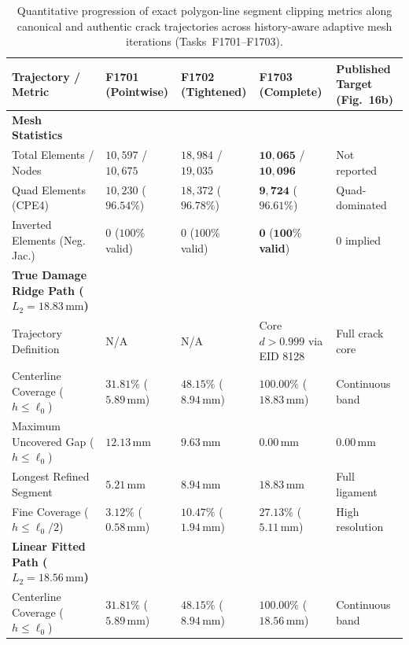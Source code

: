 \begin{table}[htbp]
\centering
\scriptsize
\renewcommand{\arraystretch}{0.90}
\caption{Quantitative progression of exact polygon-line segment clipping metrics along canonical and authentic crack trajectories across history-aware adaptive mesh iterations (Tasks~F1701--F1703).}
\label{tab:f1703_exact_clipping_progression}
\begin{tabularx}{\textwidth}{p{3.8cm}XXXX}
\hline
\textbf{Trajectory / Metric} & \textbf{F1701 (Pointwise)} & \textbf{F1702 (Tightened)} & \textbf{F1703 (Complete)} & \textbf{Published Target (Fig.~16b)} \\
\hline
\textbf{Mesh Statistics} & & & & \\
Total Elements / Nodes & $10{,}597$ / $10{,}675$ & $18{,}984$ / $19{,}035$ & $\mathbf{10{,}065}$ / $\mathbf{10{,}096}$ & Not reported \\
Quad Elements (CPE4) & $10{,}230$ ($96.54\%$) & $18{,}372$ ($96.78\%$) & $\mathbf{9{,}724}$ ($\mathbf{96.61\%}$) & Quad-dominated \\
Inverted Elements (Neg. Jac.) & $0$ ($100\%$ valid) & $0$ ($100\%$ valid) & $\mathbf{0}$ ($\mathbf{100\%}$ \textbf{valid}) & $0$ implied \\
\hline
\textbf{True Damage Ridge Path ($L_2 = 18.83\,\mathrm{mm}$)} & & & & \\
Trajectory Definition & N/A & N/A & Core $d > 0.999$ via EID 8128 & Full crack core \\
Centerline Coverage ($h \le \ell_0$) & $31.81\%$ ($5.89\,\mathrm{mm}$) & $48.15\%$ ($8.94\,\mathrm{mm}$) & $\mathbf{100.00\%}$ ($\mathbf{18.83\,\mathrm{mm}}$) & Continuous band \\
Maximum Uncovered Gap ($h \le \ell_0$) & $12.13\,\mathrm{mm}$ & $9.63\,\mathrm{mm}$ & $\mathbf{0.00\,\mathrm{mm}}$ & $0.00\,\mathrm{mm}$ \\
Longest Refined Segment & $5.21\,\mathrm{mm}$ & $8.94\,\mathrm{mm}$ & $\mathbf{18.83\,\mathrm{mm}}$ & Full ligament \\
Fine Coverage ($h \le \ell_0/2$) & $3.12\%$ ($0.58\,\mathrm{mm}$) & $10.47\%$ ($1.94\,\mathrm{mm}$) & $\mathbf{27.13\%}$ ($\mathbf{5.11\,\mathrm{mm}}$) & High resolution \\
\hline
\textbf{Linear Fitted Path ($L_2 = 18.56\,\mathrm{mm}$)} & & & & \\
Centerline Coverage ($h \le \ell_0$) & $31.81\%$ ($5.89\,\mathrm{mm}$) & $48.15\%$ ($8.94\,\mathrm{mm}$) & $\mathbf{100.00\%}$ ($\mathbf{18.56\,\mathrm{mm}}$) & Continuous band \\

\end{tabularx}
\end{table}
